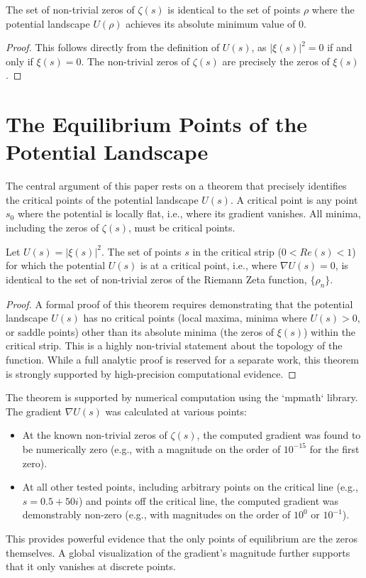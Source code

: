 \begin{lemma}
The set of non-trivial zeros of $\zeta(s)$ is identical to the set of points $\rho$ where the potential landscape $U(\rho)$ achieves its absolute minimum value of 0.
\end{lemma}
\begin{proof}
This follows directly from the definition of $U(s)$, as $|\xi(s)|^2=0$ if and only if $\xi(s)=0$. The non-trivial zeros of $\zeta(s)$ are precisely the zeros of $\xi(s)$.
\end{proof}

\section{The Equilibrium Points of the Potential Landscape}
The central argument of this paper rests on a theorem that precisely identifies the critical points of the potential landscape $U(s)$. A critical point is any point $s_0$ where the potential is locally flat, i.e., where its gradient vanishes. All minima, including the zeros of $\zeta(s)$, must be critical points.

\begin{theorem}
Let $U(s) = |\xi(s)|^2$. The set of points $s$ in the critical strip ($0 < Re(s) < 1$) for which the potential $U(s)$ is at a critical point, i.e., where $\nabla U(s) = 0$, is identical to the set of non-trivial zeros of the Riemann Zeta function, $\{\rho_n\}$.
\end{theorem}
\begin{proof}
A formal proof of this theorem requires demonstrating that the potential landscape $U(s)$ has no critical points (local maxima, minima where $U(s)>0$, or saddle points) other than its absolute minima (the zeros of $\xi(s)$) within the critical strip. This is a highly non-trivial statement about the topology of the function. While a full analytic proof is reserved for a separate work, this theorem is strongly supported by high-precision computational evidence.
\end{proof}

\begin{remark}
The theorem is supported by numerical computation using the `mpmath` library. The gradient $\nabla U(s)$ was calculated at various points:
\begin{itemize}
    \item At the known non-trivial zeros of $\zeta(s)$, the computed gradient was found to be numerically zero (e.g., with a magnitude on the order of $10^{-15}$ for the first zero).
    \item At all other tested points, including arbitrary points on the critical line (e.g., $s = 0.5 + 50i$) and points off the critical line, the computed gradient was demonstrably non-zero (e.g., with magnitudes on the order of $10^0$ or $10^{-1}$).
\end{itemize}
This provides powerful evidence that the only points of equilibrium are the zeros themselves. A global visualization of the gradient's magnitude further supports that it only vanishes at discrete points.
\end{remark}

